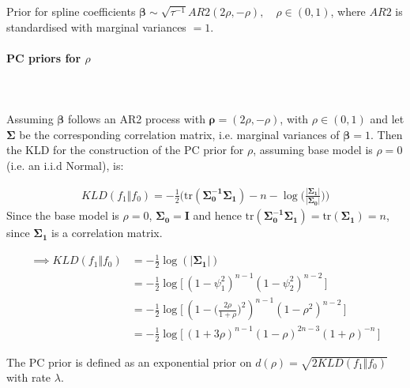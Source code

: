 \documentclass[12pt,a4paper]{article}
\date{\vspace{-5ex}}
\begin{document}
Prior for spline coefficients $\boldsymbol{\beta} \sim \sqrt{\tau^{-1}} AR2(2\rho, -\rho), \quad \rho \in (0, 1)$, where $AR2$ is standardised with marginal variances $= 1.$

\paragraph{PC priors for $\rho$} \\~\\

Assuming $\boldsymbol{\beta}$ follows an AR2 process with $\boldsymbol{\rho} = (2\rho, -\rho)$, with $\rho \in (0, 1)$ and let $\boldsymbol{\Sigma}$ be the corresponding correlation matrix, i.e. marginal variances of $\boldsymbol{\beta} = 1$. Then the KLD for the construction of the PC prior for $\rho$, assuming base model is $\rho = 0$ (i.e. an i.i.d Normal), is:

\begin{align*}
KLD(f_1 \Vert f_0) = -\frac{1}{2} \Bigg( \text{tr}(\boldsymbol{\Sigma_0^{-1} \Sigma_1}) - n - \log \Big( \frac{\vert  \boldsymbol{\Sigma_1} \vert}{\vert \boldsymbol{\Sigma_0} \vert} \Big) \Bigg)
\end{align*}
Since the base model is $\rho = 0$, $\boldsymbol{\Sigma_0} = \boldsymbol{I}$ and hence $\text{tr}(\boldsymbol{\Sigma_0^{-1}\Sigma_1}) = \text{tr}(\boldsymbol{\Sigma_1}) = n$, since $\boldsymbol{\Sigma_1}$ is a correlation matrix.

\begin{align*}
\implies KLD(f_1 \Vert f_0) &= -\frac{1}{2} \log(\vert \boldsymbol{\Sigma_1} \vert) \\
&= -\frac{1}{2} \log \big[ \, (1-\psi_1^2)^{n-1} (1-\psi_2^2)^{n-2} \, \big] \\
&= -\frac{1}{2} \log \big[ \, (1- \big(\frac{2\rho}{1+\rho}\big)^2 )^{n-1} (1-\rho^2)^{n-2}\, \big] \\
&= -\frac{1}{2} \log \big[\, (1+3\rho)^{n-1} (1-\rho)^{2n-3} (1+\rho)^{-n}  \, \big]
\end{align*}


The PC prior is defined as an exponential prior on $d(\rho) = \sqrt{2 KLD(f_1 \Vert f_0)}$ with rate $\lambda$.
\end{document}

